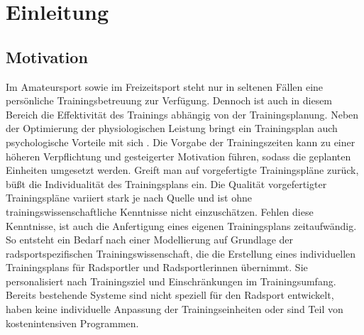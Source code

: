 \chapter{Einleitung}
\label{sec:einleitung}
\section{Motivation}
Im Amateursport sowie im Freizeitsport steht nur in seltenen Fällen eine persönliche Trainingsbetreuung zur Verfügung. Dennoch ist auch in diesem Bereich die Effektivität des Trainings abhängig von der Trainingsplanung. Neben der Optimierung der physiologischen Leistung bringt ein Trainingsplan auch psychologische Vorteile mit sich . Die Vorgabe der Trainingszeiten kann zu einer höheren Verpflichtung und gesteigerter Motivation führen, sodass die geplanten Einheiten umgesetzt werden.
Greift man auf vorgefertigte Trainingspläne zurück, büßt die Individualität des Trainingsplans ein. Die Qualität vorgefertigter Trainingspläne variiert stark je nach Quelle und ist ohne trainingswissenschaftliche Kenntnisse nicht einzuschätzen. Fehlen diese Kenntnisse, ist auch die Anfertigung eines eigenen Trainingsplans zeitaufwändig. 
So entsteht ein Bedarf nach einer Modellierung auf Grundlage der radsportspezifischen Trainingswissenschaft, die die Erstellung eines individuellen Trainingsplans für Radsportler und Radsportlerinnen übernimmt. Sie personalisiert nach Trainingsziel und Einschränkungen im Trainingsumfang. 
Bereits bestehende Systeme sind nicht speziell für den Radsport entwickelt, haben keine individuelle Anpassung der Trainingseinheiten oder sind Teil von kostenintensiven Programmen.

